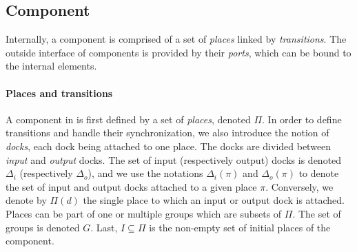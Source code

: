 \subsection{Component}

Internally, a \mad component is comprised of a set of \emph{places}
linked by \emph{transitions}. The outside interface of components is
provided by their \emph{ports}, which can be bound to the internal
elements.

\paragraph{Places and transitions}{

A component in \mad is first defined by a set of \emph{places},
denoted $\Pi$. In order to define transitions and handle their
synchronization, we also introduce the notion of \emph{docks}, each
dock being attached to one place. The docks are divided between
\emph{input} and \emph{output} docks. The set of input (respectively
output) docks is denoted $\Delta_i$ (respectively $\Delta_o$), and we
use the notations $\Delta_i (\pi)$ and $\Delta_o (\pi)$ to denote the
set of input and output docks attached to a given
place $\pi$. Conversely, we denote by $\Pi(d)$ the single place to
which an input or output dock is attached. Places can be part of one
or multiple groups which are subsets of $\Pi$. The set of groups is
denoted $G$. Last, $I \subseteq \Pi$ is the non-empty set of initial
places of the component.

}

